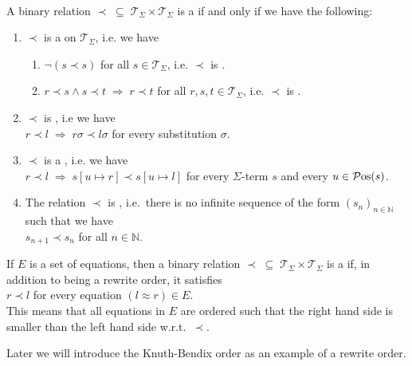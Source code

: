 \begin{Definition} \hspace*{\fill} \\
  A binary relation $\prec \;\subseteq\; \mathcal{T}_\Sigma \times \mathcal{T}_\Sigma$ is a
   if and only if we have the following:
  \begin{enumerate}
  \item $\prec$ is a  on $\mathcal{T}_\Sigma$, i.e. we have
        \begin{enumerate}
        \item $\neg (s \prec s)$ \hspace*{2.6cm} for all $s \in \mathcal{T}_\Sigma$, i.e. $\prec$ is .
        \item $r \prec s \wedge s \prec t \;\Rightarrow\; r \prec t$ \quad for all $r,s,t \in \mathcal{T}_\Sigma$,
              i.e. $\prec$ is . 
        \end{enumerate}
    
  \item $\prec$ is , i.e we have
        \\[0.2cm]
        \hspace*{1.3cm}
        $r \prec l \;\Rightarrow\; r\sigma \prec l\sigma$ \quad for every substitution $\sigma$.
  \item $\prec$ is a , i.e. we have
        \\[0.2cm]
        \hspace*{1.3cm}
        $r \prec l \;\Rightarrow\; s[u \mapsto r] \prec s[u \mapsto l]$ for every $\Sigma$-term $s$ and every
        $u \in\mathcal{P}\mathrm{os}(s)  $.
  \item The relation $\prec$ is , i.e.~there is no infinite sequence of the form
        $(s_n)_{n\in\mathbb{N}}$ such that we have
        \\[-0.2cm]
        \hspace*{1.3cm}
        $s_{n+1} \prec s_n$ \quad for all $n \in \mathbb{N}$. 
  \end{enumerate}
  If $E$ is a set of equations, then a binary relation $\prec \;\subseteq\; \mathcal{T}_\Sigma \times \mathcal{T}_\Sigma$
  is a  if, in addition to being a rewrite order, it satisfies
  \\[0.2cm]
  \hspace*{1.3cm}
  $r \prec l$ \quad for every equation $(l \approx r) \in E$.
  \\[0.2cm]    
  This means that all equations in $E$ are ordered such that the right hand side is smaller than the left
  hand side w.r.t.~$\prec$.    \eod
\end{Definition}
Later we will introduce the Knuth-Bendix order as an example of a rewrite order.

